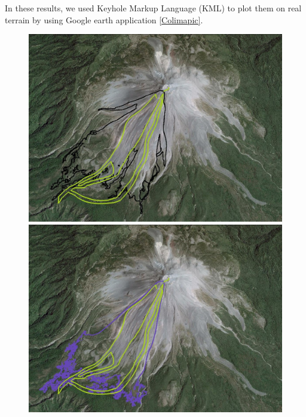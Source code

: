 \documentclass[letterpaper,10pt]{article}
\begin{document}
In these results, we used Keyhole Markup Language (KML)  to plot them on real terrain by using Google earth application \ref{Colimapic}. 
\begin{figure}[H]
\begin{minipage}[b]{.5\linewidth}
        \centering
                \includegraphics[width=.95\textwidth]{IMAGES/tiny1.jpg}
                \includegraphics[width=.95\textwidth]{IMAGES/levelset1.jpg}

\end{minipage}
\end{figure}
\end{document}
